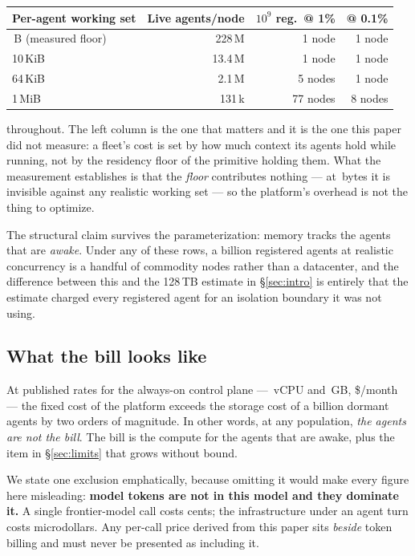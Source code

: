 \begin{center}
\begin{tabular}{lrrr}
\toprule
\textbf{Per-agent working set} & \textbf{Live agents/node} & \textbf{$10^9$ reg.\ @ 1\%} & \textbf{@ 0.1\%} \\
\midrule
\rGoPer{}\,B (measured floor)  & 228\,M & 1 node & 1 node \\
10\,KiB                        & 13.4\,M & 1 node & 1 node \\
64\,KiB                        & 2.1\,M  & 5 nodes & 1 node \\
1\,MiB                         & 131\,k  & 77 nodes & 8 nodes \\
\bottomrule
\end{tabular}
\end{center}

\modeled{} throughout. The left column is the one that matters and it is the one
this paper did not measure: a fleet's cost is set by how much context its agents
hold while running, not by the residency floor of the primitive holding them.
What the measurement establishes is that the \emph{floor} contributes nothing ---
at \rGoPer{}\,bytes it is invisible against any realistic working set --- so the
platform's overhead is not the thing to optimize.

The structural claim survives the parameterization: memory tracks the agents
that are \emph{awake}. Under any of these rows, a billion registered agents at
realistic concurrency is a handful of commodity nodes rather than a datacenter,
and the difference between this and the 128\,TB estimate in \S\ref{sec:intro} is
entirely that the estimate charged every registered agent for an isolation
boundary it was not using.

\subsection{What the bill looks like}

At published rates for the always-on control plane --- \rPlaneCpu{}\,vCPU and
\rPlaneRam{}\,GB, \$\rPlaneCost{}/month~\cite{railway} \cited{} --- the fixed
cost of the platform exceeds the storage cost of a billion dormant agents by two
orders of magnitude. In other words, at any population, \emph{the agents are not
the bill}. The bill is the compute for the agents that are awake, plus the item
in \S\ref{sec:limits} that grows without bound.

We state one exclusion emphatically, because omitting it would make every figure
here misleading: \textbf{model tokens are not in this model and they dominate
it.} A single frontier-model call costs cents; the infrastructure under an agent
turn costs microdollars. Any per-call price derived from this paper sits
\emph{beside} token billing and must never be presented as including it.
